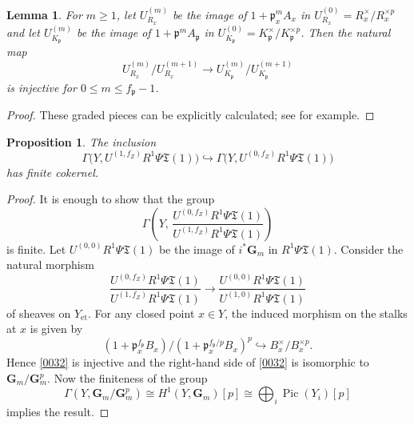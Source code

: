 \documentclass{amsart}
\newtheorem{Prop}[Thm]{Proposition}
\newtheorem{Lem}[Thm]{Lemma}
\theoremstyle{remark}
\numberwithin{equation}{section}
\newcommand{\into}{\hookrightarrow}
\newcommand{\et}{\mathrm{et}}
\newcommand{\Gm}{\mathbf{G}_{m}}
\newcommand{\ideal}[1]{\mathfrak{#1}}
\DeclareMathOperator{\Pic}{Pic}
\begin{document}
\begin{Lem} \label{0031}
	For $m \ge 1$, let $U_{R_{x}}^{(m)}$ be the image of $1 + \ideal{p}_{x}^{m} A_{x}$
	in $U_{R_{x}}^{(0)} = R_{x}^{\times} / R_{x}^{\times p}$
	and let $U_{K_{\ideal{p}}}^{(m)}$ be the image of $1 + \ideal{p}^{m} A_{\ideal{p}}$
	in $U_{K_{\ideal{p}}}^{(0)} = K_{\ideal{p}}^{\times} / K_{\ideal{p}}^{\times p}$.
	Then the natural map
		\[
				U_{R_{x}}^{(m)} / U_{R_{x}}^{(m + 1)}
			\to
				U_{K_{\ideal{p}}}^{(m)} / U_{K_{\ideal{p}}}^{(m + 1)}
		\]
	is injective for $0 \le m \le f_{\ideal{p}} - 1$.
\end{Lem}

\begin{proof}
	These graded pieces can be explicitly calculated;
	see \cite[Section 4]{Sai86} for example.
\end{proof}

\begin{Prop} \label{0023}
	The inclusion
		\[
				\Gamma \bigl(
					Y, U^{(1, f_{Z})} R^{1} \Psi \mathfrak{T}(1)
				\bigr)
			\into
				\Gamma \bigl(
					Y, U^{(0, f_{Z})} R^{1} \Psi \mathfrak{T}(1)
				\bigr)
		\]
	has finite cokernel.
\end{Prop}

\begin{proof}
	It is enough to show that the group
		\[
			\Gamma \left(
				Y,\,
				\frac{
					U^{(0, f_{Z})} R^{1} \Psi \mathfrak{T}(1)
				}{
					U^{(1, f_{Z})} R^{1} \Psi \mathfrak{T}(1)
				}
			\right)
		\]
	is finite.
	Let $U^{(0, 0)} R^{1} \Psi \mathfrak{T}(1)$ be
	the image of $i^{\ast} \Gm$ in $R^{1} \Psi \mathfrak{T}(1)$.
	Consider the natural morphism
		\begin{equation} \label{0032}
				\frac{
					U^{(0, f_{Z})} R^{1} \Psi \mathfrak{T}(1)
				}{
					U^{(1, f_{Z})} R^{1} \Psi \mathfrak{T}(1)
				}
			\to
				\frac{
					U^{(0, 0)} R^{1} \Psi \mathfrak{T}(1)
				}{
					U^{(1, 0)} R^{1} \Psi \mathfrak{T}(1)
				}
		\end{equation}
	of sheaves on $Y_{\et}$.
	For any closed point $x \in Y$,
	the induced morphism on the stalks at $x$ is given by
		\[
					(1 + \ideal{p}_{x}^{f_{\ideal{p}}} B_{x})
				/
					(1 + \ideal{p}_{x}^{f_{\ideal{p}} / p} B_{x})^{p}
			\into
				B_{x}^{\times} / B_{x}^{\times p}.
		\]
	Hence \eqref{0032} is injective
	and the right-hand side of \eqref{0032} is isomorphic to $\Gm / \Gm^{p}$.
	Now the finiteness of the group
		\[
				\Gamma(Y, \Gm / \Gm^{p})
			\cong
				H^{1}(Y, \Gm)[p]
			\cong
				\bigoplus_{i} \Pic(Y_{i})[p]
		\]
	implies the result.
\end{proof}
\end{document}
